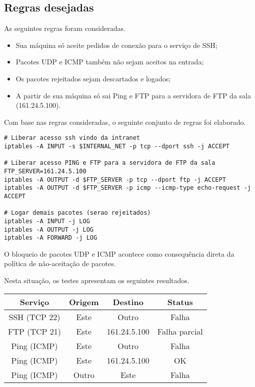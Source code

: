 \documentclass[a4paper,titlepage,11pt]{article}
\begin{document}
\subsection{Regras desejadas}

As seguintes regras foram consideradas.

\begin{itemize}
	\item Sua máquina só aceite pedidos de conexão para o serviço de SSH;
	\item Pacotes UDP e ICMP também não sejam aceitos na entrada;
	\item Os pacotes rejeitados sejam descartados e logados;
	\item A partir de sua máquina só sai Ping e FTP para a servidora de FTP da sala (161.24.5.100).
\end{itemize}

Com base nas regras consideradas, o seguinte conjunto de regras foi elaborado.

\begin{Verbatim}
# Liberar acesso ssh vindo da intranet
iptables -A INPUT -s $INTERNAL_NET -p tcp --dport ssh -j ACCEPT

# Liberar acesso PING e FTP para a servidora de FTP da sala
FTP_SERVER=161.24.5.100
iptables -A OUTPUT -d $FTP_SERVER -p tcp --dport ftp -j ACCEPT
iptables -A OUTPUT -d $FTP_SERVER -p icmp --icmp-type echo-request -j ACCEPT

# Logar demais pacotes (serao rejeitados)
iptables -A INPUT -j LOG
iptables -A OUTPUT -j LOG
iptables -A FORWARD -j LOG
\end{Verbatim}

O bloqueio de pacotes UDP e ICMP acontece como consequência direta da política de não-aceitação de pacotes.

Nesta situação, os testes apresentam os seguintes resultados.
\begin{center}
	\begin{tabular}{cccc}
		\hline
		Serviço & Origem & Destino & Status  \\
		\hline
		SSH (TCP 22) & Este & Outro & Falha \\
		FTP (TCP 21) & Este & 161.24.5.100 & Falha parcial \\
		Ping (ICMP) & Este & Outro & Falha \\
		Ping (ICMP) & Este & 161.24.5.100 & OK \\
		Ping (ICMP) & Outro & Este & Falha \\
		\hline
	\end{tabular}
\end{center}
\end{document}

